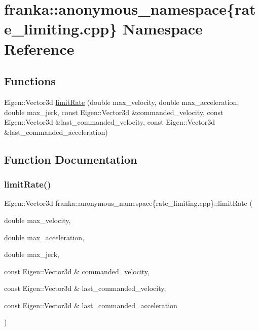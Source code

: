 \hypertarget{namespacefranka_1_1anonymous__namespace_02rate__limiting_8cpp_03}{}\section{franka\+:\+:anonymous\+\_\+namespace\{rate\+\_\+limiting.\+cpp\} Namespace Reference}
\label{namespacefranka_1_1anonymous__namespace_02rate__limiting_8cpp_03}
\subsection*{Functions}
\begin{DoxyCompactItemize}
\item 
Eigen\+::\+Vector3d \hyperlink{namespacefranka_1_1anonymous__namespace_02rate__limiting_8cpp_03_aa1d64bbd7b303af83e6a76b92298d73a}{limit\+Rate} (double max\+\_\+velocity, double max\+\_\+acceleration, double max\+\_\+jerk, const Eigen\+::\+Vector3d \&commanded\+\_\+velocity, const Eigen\+::\+Vector3d \&last\+\_\+commanded\+\_\+velocity, const Eigen\+::\+Vector3d \&last\+\_\+commanded\+\_\+acceleration)
\end{DoxyCompactItemize}


\subsection{Function Documentation}
\mbox{\label{namespacefranka_1_1anonymous__namespace_02rate__limiting_8cpp_03_aa1d64bbd7b303af83e6a76b92298d73a}} 
\subsubsection{\texorpdfstring{limit\+Rate()}{limitRate()}}
{\footnotesize\ttfamily Eigen\+::\+Vector3d franka\+::anonymous\+\_\+namespace\{rate\+\_\+limiting.\+cpp\}\+::limit\+Rate (\begin{DoxyParamCaption}\item[{double}]{max\+\_\+velocity,  }\item[{double}]{max\+\_\+acceleration,  }\item[{double}]{max\+\_\+jerk,  }\item[{const Eigen\+::\+Vector3d \&}]{commanded\+\_\+velocity,  }\item[{const Eigen\+::\+Vector3d \&}]{last\+\_\+commanded\+\_\+velocity,  }\item[{const Eigen\+::\+Vector3d \&}]{last\+\_\+commanded\+\_\+acceleration }\end{DoxyParamCaption})}




